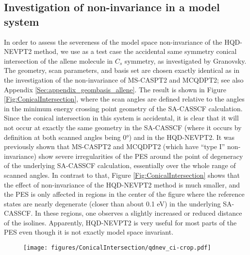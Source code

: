 \subsection{Investigation of non-invariance in a model system}
\label{Sec:allene_noninvariance}
In order to assess the severeness of the model space non-invariance of the HQD-NEVPT2 method, we use as a test case the accidental same symmetry conical intersection of the allene molecule in $C_s$ symmetry, as investigated by Granovsky.\cite{Grano_2011_214113} The geometry, scan parameters, and basis set are chosen exactly identical as in the investigation of the non-invariance of MS-CASPT2 and MCQDPT2;\cite{Grano_2011_214113} see also Appendix \ref{Sec:appendix_geombasis_allene}. The result is shown in Figure \ref{Fig:ConicalIntersection}, where the scan angles are defined relative to the angles in the minimum energy crossing point geometry of the SA-CASSCF calculation. Since the conical intersection in this system is accidental, it is clear that it will not occur at exactly the same geometry in the SA-CASSCF (where it occurs by definition at both scanned angles being 0°) and in the HQD-NEVPT2. It was previously shown that MS-CASPT2 and MCQDPT2 (which have “type I” non-invariance) show severe irregularities of the PES around the point of degeneracy of the underlying SA-CASSCF calculation, essentially over the whole range of scanned angles.\cite{Grano_2011_214113} In contrast to that, Figure \ref{Fig:ConicalIntersection} shows that the effect of non-invariance of the HQD-NEVPT2 method is much smaller, and the PES is only affected in regions in the center of the figure where the reference states are nearly degenerate (closer than about 0.1 eV) in the underlying SA-CASSCF. In these regions, one observes a slightly increased or reduced distance of the isolines. Apparently, HQD-NEVPT2 is very useful for most parts of the PES even though it is not exactly model space invariant.
\begin{figure}
{\texttt{[image: figures/ConicalIntersection/qdnev\_ci-crop.pdf]}}
\end{figure}

